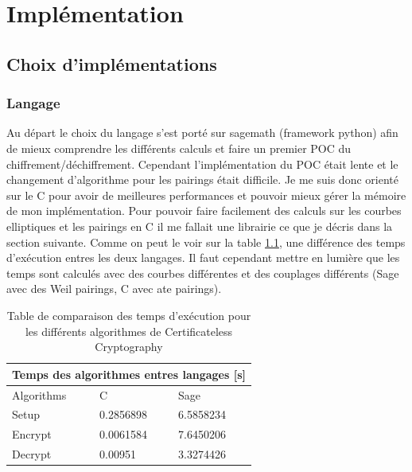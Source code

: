 \chapter{Implémentation}
\label{ch:impl}

\section{Choix d'implémentations}
\subsection{Langage}
Au départ le choix du langage s'est porté sur sagemath (framework python) afin de mieux comprendre les différents calculs et faire un premier POC du chiffrement/déchiffrement.
Cependant l'implémentation du POC était lente et le changement d'algorithme pour les pairings était difficile.
Je me suis donc orienté sur le C pour avoir de meilleures performances et pouvoir mieux gérer la mémoire de mon implémentation. Pour pouvoir faire facilement des calculs sur les courbes elliptiques et les pairings en C il me fallait une librairie ce que je décris dans la section suivante. Comme on peut le voir sur la table \ref{table:comparisonTimeAlgo}, une différence des temps d'exécution entres les deux langages. Il faut cependant mettre en lumière que les temps sont calculés avec des courbes différentes et des couplages différents (Sage avec des Weil pairings, C avec ate pairings).

\begin{table}[h!]
	\centering
	\begin{tabular}{ |p{3cm}||p{3cm}|p{3cm}| }
		\hline
		\multicolumn{3}{|c|}{Temps des algorithmes entres langages [s]} \\
		\hline
		Algorithms& C &Sage\\
		\hline
		Setup   & 0.2856898 & 6.5858234\\
		Encrypt & 0.0061584 & 7.6450206\\
		Decrypt & 0.00951 & 3.3274426\\
		\hline
	\end{tabular}
\caption{Table de comparaison des temps d'exécution pour les différents algorithmes de Certificateless Cryptography }
\label{table:comparisonTimeAlgo}
\end{table}

